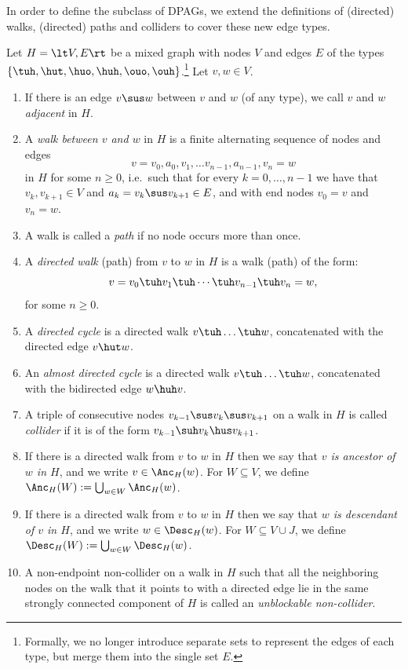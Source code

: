 In order to define the subclass of DPAGs, we 
extend the definitions of (directed) walks, (directed) paths and colliders to cover these new edge types.
\begin{Def}\label{def:more_walks}
  Let $H=\lt V,E \rt$ be a mixed graph with nodes $V$ and edges $E$ of the types $\{\tuh,\hut,\huo,\huh,\ouo,\ouh\}$.\footnote{Formally, we no longer introduce separate sets to represent the edges of each type, but merge them into the single set $E$.}
  Let $v,w \in V$.
  \begin{enumerate}
    \item If there is an edge $v \sus w$ between $v$ and $w$ (of any type), we call $v$ and $w$ \emph{adjacent} in $H$.
    \item A \emph{walk between $v$ and $w$} in $H$ is a finite alternating sequence of nodes and edges 
        \[v=v_0, a_0, v_1, \dots v_{n-1}, a_{n-1}, v_n=w\] 
        in $H$ for some $n \ge 0$, i.e.\ such that for every $k=0,\dots,n-1$ 
        we have that $v_{k},v_{k+1} \in V$ and $a_k = v_k \sus v_{k+1} \in E$, and with end nodes $v_0=v$ and $v_n=w$.
    \item A walk is called a \emph{path} if no node occurs more than once.
    \item A \emph{directed walk} (path) from $v$ to $w$ in $H$ is a walk (path) of the form:
        \[v=v_0 \tuh v_1 \tuh  \cdots \tuh v_{n-1} \tuh v_n=w,\]
        for some $n \ge 0$.
    \item A \emph{directed cycle} is a directed walk $v \tuh \dots \tuh w$, concatenated with
      the directed edge $v \hut w$.
    \item An \emph{almost directed cycle} is a directed walk $v \tuh \dots \tuh w$, concatenated
      with the bidirected edge $w \huh v$.
    \item A triple of consecutive nodes $v_{k-1} \sus v_k \sus v_{k+1}$ on a walk in $H$ is called \emph{collider}
      if it is of the form $v_{k-1} \suh v_k \hus v_{k+1}$.
    \item If there is a directed walk from $v$ to $w$ in $H$ then we say that \emph{$v$ is ancestor of $w$ in $H$}, 
      and we write $v \in \Anc_H(w)$. For $W \subseteq V$, we define $\Anc_H(W) := \bigcup_{w\in W} \Anc_H(w)$.
    \item If there is a directed walk from $v$ to $w$ in $H$ then we say that \emph{$w$ is descendant of $v$ in $H$}, 
      and we write $w \in \Desc_H(w)$. For $W \subseteq V \cup J$, we define $\Desc_H(W) := \bigcup_{w\in W} \Desc_H(w)$.
    \item A non-endpoint non-collider on a walk in $H$ such that all the neighboring nodes on the walk that it points to with a directed edge lie in the same strongly connected component of $H$ is called an \emph{unblockable non-collider}.

\end{enumerate}
\end{Def}
